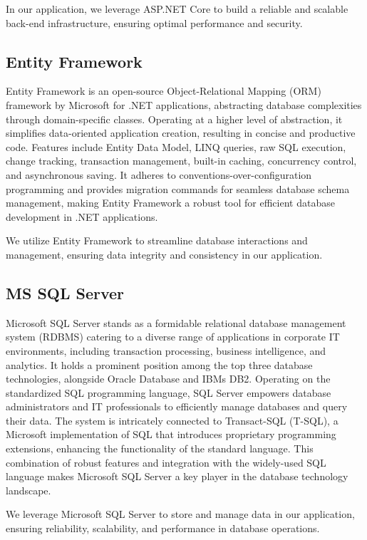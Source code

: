 In our application, we leverage ASP.NET Core to build a reliable and
scalable back-end infrastructure, ensuring optimal performance and
security.

\subsection{Entity Framework}

Entity Framework is an open-source Object-Relational Mapping (ORM)
framework by Microsoft for .NET applications, abstracting database
complexities through domain-specific classes. Operating at a higher
level of abstraction, it simplifies data-oriented application creation,
resulting in concise and productive code. Features include Entity Data
Model, LINQ queries, raw SQL execution, change tracking, transaction
management, built-in caching, concurrency control, and asynchronous
saving. It adheres to conventions-over-configuration programming and
provides migration commands for seamless database schema management,
making Entity Framework a robust tool for efficient database development
in .NET applications.

We utilize Entity Framework to streamline database interactions and
management, ensuring data integrity and consistency in our application.


\subsection{MS SQL Server}

Microsoft SQL Server stands as a formidable relational database
management system (RDBMS) catering to a diverse range of applications in
corporate IT environments, including transaction processing, business
intelligence, and analytics. It holds a prominent position among the top
three database technologies, alongside Oracle Database and
IBM\textquotesingle s DB2. Operating on the standardized SQL programming
language, SQL Server empowers database administrators and IT
professionals to efficiently manage databases and query their data. The
system is intricately connected to Transact-SQL (T-SQL), a Microsoft
implementation of SQL that introduces proprietary programming
extensions, enhancing the functionality of the standard language. This
combination of robust features and integration with the widely-used SQL
language makes Microsoft SQL Server a key player in the database
technology landscape.

We leverage Microsoft SQL Server to store and manage data in our
application, ensuring reliability, scalability, and performance in
database operations.


